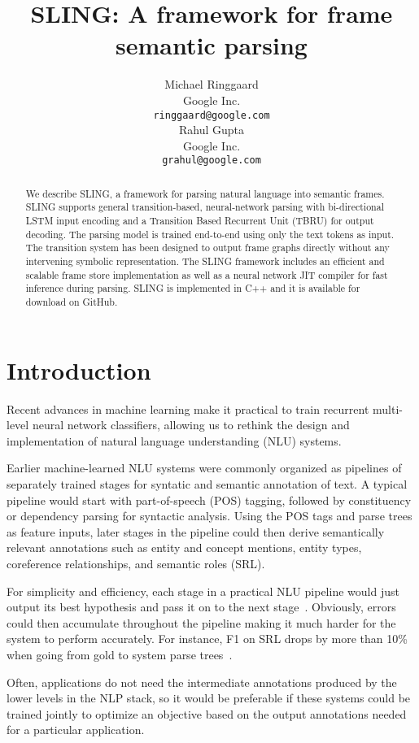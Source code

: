 \documentclass[11pt,a4paper]{article}
\title{SLING: A framework for frame semantic parsing}
\author{
Michael Ringgaard \\ Google Inc. \\ {\tt ringgaard@google.com} \\\And
Rahul Gupta \\ Google Inc. \\ {\tt grahul@google.com} \\
}
\begin{document}
\maketitle

\begin{abstract}
We describe SLING, a framework for parsing natural language into
semantic frames. SLING supports general transition-based, neural-network parsing with
bi-directional LSTM input encoding and a Transition Based Recurrent
Unit (TBRU) for output decoding. The parsing model is 
trained end-to-end using only the text tokens as input. The
transition system has been designed to output frame graphs directly without
any intervening symbolic representation.
The SLING framework includes an efficient and scalable frame store
implementation as well as a neural network JIT compiler for fast inference during parsing.
SLING is implemented in C++ and it is available for download
on GitHub.
\end{abstract}

\section{Introduction}

Recent advances in machine learning make it practical to train
recurrent multi-level neural network classifiers, allowing us to rethink the
design and implementation of natural language
understanding (NLU) systems.

Earlier machine-learned NLU systems were commonly organized as pipelines of
separately trained stages for syntatic and semantic annotation of text.
A typical  pipeline would start with part-of-speech (POS) tagging, followed by
constituency or dependency parsing for syntactic analysis.
Using the POS tags and parse trees as feature inputs, later stages in the pipeline could then
derive semantically relevant annotations such as entity and concept mentions, entity types, coreference relationships,
and semantic roles (SRL).

For simplicity and efficiency, each stage in a practical NLU pipeline would just output its best hypothesis
and pass it on to the next stage~\cite{finkel2006}.
Obviously, errors could then accumulate
throughout the pipeline making it much harder for the system to perform
accurately. For instance, F1 on SRL drops by more than 10\% when going from gold to
system parse trees~\cite{toutanova2005}.

Often, applications do not need the intermediate annotations produced
by the lower levels in the NLP stack, so it would be preferable if these systems
could be trained jointly to optimize an objective based on the output
annotations needed for a particular application.
\end{document}
